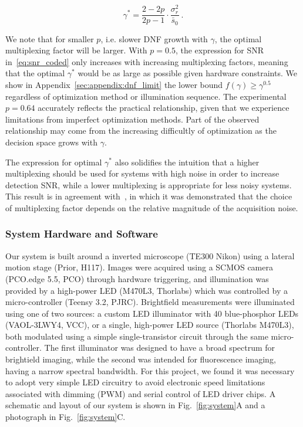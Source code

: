 \begin{equation}
    \label{eq:optimal_gamma}
    \gamma^* = \frac{2-2p}{2p-1} \cdot \frac{\sigma_r^2}{\bar{s}_0}\:.
\end{equation}

We note that for smaller $p$, i.e. slower DNF growth with $\gamma$, the optimal multiplexing factor will be larger.
With $p=0.5$, the expression for SNR in~\eqref{eq:snr_coded} only increases with increasing multiplexing factors, meaning that the optimal $\gamma^*$ would be as large as possible given hardware constraints.
We show in Appendix~\ref{sec:appendix:dnf_limit} the lower bound $f(\gamma)\geq \gamma^{0.5}$ regardless of optimization method or illumination sequence.
The experimental $p=0.64$ accurately reflects the practical relationship, given that we experience limitations from imperfect optimization methods. Part of the observed relationship may come from the increasing difficultly of optimization as the decision space grows with $\gamma$.

The expression for optimal $\gamma^*$ also solidifies the intuition that a higher multiplexing should be used for systems with high noise in order to increase detection SNR, while a lower multiplexing is appropriate for less noisy systems. This result is in agreement with~\cite{agrawal2009optimal}, in which it was demonstrated that the choice of multiplexing factor depends on the relative magnitude of the acquisition noise.

\subsubsection{System Hardware and Software} \label{sec:highthroughput:hardware}
Our system is built around a inverted microscope (TE300 Nikon) using a lateral motion stage (Prior, H117). Images were acquired using a SCMOS camera (PCO.edge 5.5, PCO) through hardware triggering, and illumination was provided by a high-power LED (M470L3, Thorlabs) which was controlled by a micro-controller (Teensy 3.2, PJRC). Brightfield measurements were illuminated using one of two sources: a custom LED illuminator with 40 blue-phosphor LEDs (VAOL-3LWY4, VCC), or a single, high-power LED source (Thorlabs M470L3), both modulated using a simple single-transistor circuit through the same micro-controller. The first illuminator was designed to have a broad spectrum for brightield imaging, while the second was intended for fluorescence imaging, having a narrow spectral bandwidth. For this project, we found it was necessary to adopt very simple LED circuitry to avoid electronic speed limitations associated with dimming (PWM) and serial control of LED driver chips. A schematic and layout of our system is shown in Fig.~\ref{fig:system}A and a photograph in Fig.~\ref{fig:system}C.

